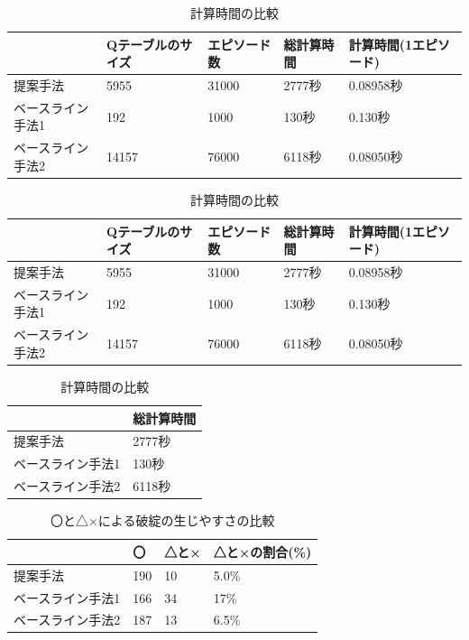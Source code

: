 \documentclass[12pt,a4paper,twoside,openany]{jbook}
\begin{document}
\begin{table}[tb]
    \caption{計算時間の比較}\label{keisanryohyo}
    \scriptsize
    \centering
    \begin{tabular}{|l|l|l|l|l|}\hline 
         &Qテーブルのサイズ&エピソード数&総計算時間&計算時間(1エピソード)  \\ \hline 
         提案手法&5955&31000&2777秒&0.08958秒 \\ \hline
         ベースライン手法1&192&1000&130秒&0.130秒 \\ \hline
         ベースライン手法2&14157&76000&6118秒&0.08050秒 \\ \hline
    \end{tabular}
\end{table}

\begin{table}[tb]
    \caption{計算時間の比較}\label{keisanryohyo}
    \scriptsize
    \centering
    \begin{tabular}{|l|l|l|l|l|}\hline 
         &Qテーブルのサイズ&エピソード数&総計算時間&計算時間(1エピソード)  \\ \hline 
         提案手法&5955&31000&2777秒&0.08958秒 \\ \hline
         ベースライン手法1&192&1000&130秒&0.130秒 \\ \hline
         ベースライン手法2&14157&76000&6118秒&0.08050秒 \\ \hline
    \end{tabular}
\end{table}\begin{table}[tb]
    \caption{計算時間の比較}\label{keisanryohyo}
    \scriptsize
    \centering
    \begin{tabular}{|l|l|}\hline 
         &総計算時間  \\ \hline 
         提案手法&2777秒 \\ \hline
         ベースライン手法1&130秒 \\ \hline
         ベースライン手法2&6118秒 \\ \hline
    \end{tabular}
\end{table}
\begin{table}[tb]
\caption{〇と△×による破綻の生じやすさの比較}\centering\label{hatanhindohyo2}
  \begin{tabular}{|l|l|l|l|} \hline
     & 〇& △と×&△と×の割合(\%)\\ \hline \hline
    提案手法 & 190 & 10 &5.0\% \\ \hline
    ベースライン手法1 & 166 & 34 &  17\% \\ \hline
    ベースライン手法2 &  187&  13 & 6.5\% \\ \hline
  \end{tabular}
\end{table}
\end{document}
